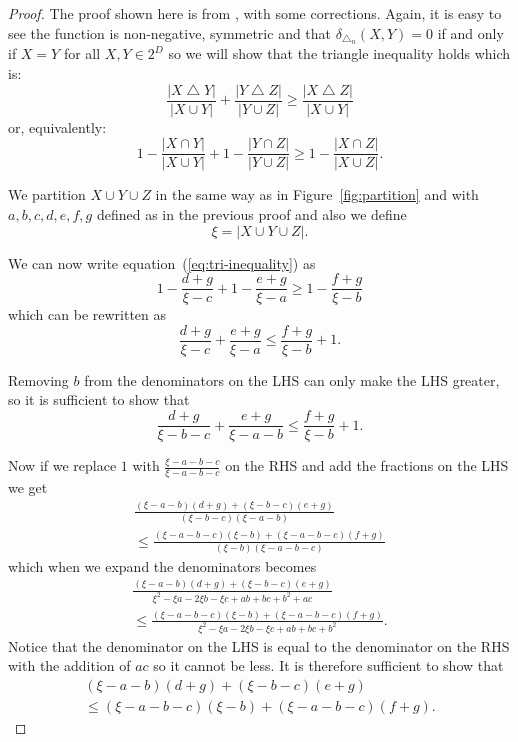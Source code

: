 \documentclass[a4paper]{report}
\DeclareMathOperator{\symdif}{\bigtriangleup}
\newcommand{\dset}{D}
\begin{document}
\begin{proof}
  The proof shown here is from \citep{yianilos91}, with some corrections.
  Again, it is easy to see the function is non-negative, symmetric and that
  $\delta_{\symdif_n}(X,Y)=0$ if and only if $X=Y$ for all $X,Y \in 2^{\dset}$
  so we will show that the triangle inequality holds which is:
  \begin{equation*}
    \frac{|X \symdif Y|}{|X \cup Y|} + \frac{|Y \symdif Z|}{|Y \cup Z|} \geq
    \frac{|X \symdif Z|}{|X \cup Y|}
  \end{equation*}
  or, equivalently:
  \begin{equation}
    \label{eq:tri-inequality}
    1 - \frac{|X \cap Y|}{|X \cup Y|} +
    1 - \frac{|Y \cap Z|}{|Y \cup Z|} \geq
    1 - \frac{|X \cap Z|}{|X \cup Z|}.
  \end{equation}

  We partition $X \cup Y \cup Z$ in the same way as in
  Figure~\ref{fig:partition} and with $a,b,c,d,e,f,g$ defined as in the
  previous proof and also we define
  \begin{equation*}
    \xi  = |X \cup Y \cup Z|.
  \end{equation*}

  We can now write equation~(\ref{eq:tri-inequality}) as
  \begin{equation*}
    1 - \frac{d+g}{\xi -c} + 1 - \frac{e+g}{\xi -a} \geq 1 - \frac{f+g}{\xi -b}
  \end{equation*}
  which can be rewritten as
  \begin{equation*}
    \frac{d+g}{\xi -c} + \frac{e+g}{\xi -a} \leq \frac{f+g}{\xi -b} + 1.
  \end{equation*}

  Removing $b$ from the denominators on the LHS can only make the LHS
  greater, so it is sufficient to show that
  \begin{equation*}
    \frac{d+g}{\xi -b-c} + \frac{e+g}{\xi -a-b} \leq \frac{f+g}{\xi -b} + 1.
  \end{equation*}

  Now if we replace $1$ with $\frac{\xi -a-b-c}{\xi -a-b-c}$ on the RHS and add
  the fractions on the LHS we get
  \begin{multline*}
    \frac{(\xi -a-b)(d+g)+(\xi -b-c)(e+g)}{(\xi -b-c)(\xi -a-b)}\\
    \leq \frac{(\xi -a-b-c)(\xi -b)+(\xi -a-b-c)(f+g)}{(\xi -b)(\xi -a-b-c)}
  \end{multline*}
  which when we expand the denominators becomes
  \begin{multline*}
    \frac{(\xi -a-b)(d+g)+(\xi -b-c)(e+g)}{\xi ^2-\xi a-2\xi b-\xi c+ab+bc+b^2+ac}\\
    \leq \frac{(\xi -a-b-c)(\xi -b)+(\xi -a-b-c)(f+g)}{\xi ^2-\xi a-2\xi b-\xi c+ab+bc+b^2}.
  \end{multline*}
  Notice that the denominator on the LHS is equal to the denominator on the
  RHS with the addition of $ac$ so it cannot be less.  It is therefore
  sufficient to show that
  \begin{multline*}
    (\xi -a-b)(d+g)+(\xi -b-c)(e+g)\\
    \leq (\xi -a-b-c)(\xi -b)+(\xi -a-b-c)(f+g).
  \end{multline*}


\end{proof}
\end{document}

